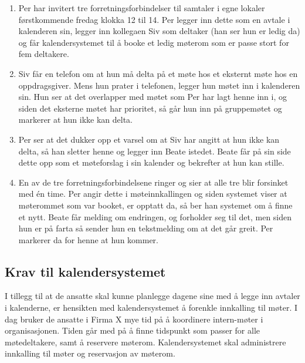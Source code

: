 \begin{enumerate}
\label{sec:scenarios}

\item
Per har invitert tre forretningsforbindelser til samtaler i egne lokaler førstkommende fredag klokka 12 til 14. Per legger inn dette som en avtale i kalenderen sin, legger inn kollegaen Siv som deltaker (han ser hun er ledig da) og får kalendersystemet til å booke et ledig møterom som er passe stort for fem deltakere.

\item
Siv får en telefon om at hun må delta på et møte hos et eksternt møte hos en oppdragsgiver. Mens hun prater i telefonen, legger hun møtet inn i kalenderen sin. Hun ser at det overlapper med møtet som Per har lagt henne inn i, og siden det eksterne møtet har prioritet, så går hun inn på gruppemøtet og markerer at hun ikke kan delta.

\item
Per ser at det dukker opp et varsel om at Siv har angitt at hun ikke kan delta, så han sletter henne og legger inn Beate istedet. Beate får på sin side dette opp som et møteforslag i sin kalender og bekrefter at hun kan stille.

\item
En av de tre forretningsforbindelsene ringer og sier at alle tre blir forsinket med én time. Per angir dette i møteinnkallingen og siden systemet viser at møterommet som var booket, er opptatt da, så ber han systemet om å finne et nytt. Beate får melding om endringen, og forholder seg til det, men siden hun er på farta så sender hun en tekstmelding om at det går greit. Per markerer da for henne at hun kommer.

\end{enumerate}

\subsection{Krav til kalendersystemet}

I tillegg til at de ansatte skal kunne planlegge dagene sine med å legge inn avtaler i kalenderne, er hensikten med kalendersystemet å forenkle innkalling til møter. I dag bruker de ansatte i Firma X mye tid på å koordinere intern-møter i organisasjonen. Tiden går med på å finne tidspunkt som passer for alle møtedeltakere, samt å reservere møterom. Kalendersystemet skal administrere innkalling til møter og reservasjon av møterom.

